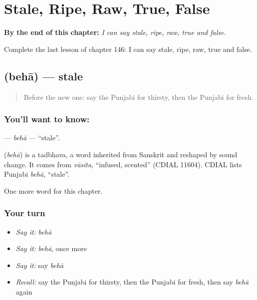 
\chapter{Stale, Ripe, Raw, True, False}
\label{ch:pa-stale-ripe-raw-true-false}

\begin{chapteropening}
\textbf{By the end of this chapter:} \emph{I can say stale, ripe, raw, true and false.}

Complete the last lesson of chapter 146: I can say stale, ripe, raw, true and false.
\end{chapteropening}

\section[\texorpdfstring{\pa{ਬੇਹਾ} (behā)}{ਬੇਹਾ (behā)}]{ (behā) — stale}

\label{lesson:PA-C146-beha}



\begin{quote}
Before the new one: say the Punjabi for thirsty, then the Punjabi for fresh.
\end{quote}

\subsection*{You'll want to know: }
\textbf{} — \emph{behā} — \textquotedblleft{}stale\textquotedblright{}.

\begin{cousinweb}
\textbf{} (\emph{behā}) is a tadbhava, a word inherited from Sanskrit and reshaped by sound change. It comes from \emph{vāsita}, \textquotedblleft{}infused, scented\textquotedblright{} (CDIAL 11604). CDIAL lists Punjabi \emph{behā}, \textquotedblleft{}stale\textquotedblright{}.
\end{cousinweb}

\begin{grammarlens}[title={What you've built}]
One more word for this chapter.
\end{grammarlens}

\subsection*{Your turn}
\begin{itemize}
\raggedright
  \item \emph{Say it:} \emph{behā}
  \item \emph{Say it:} \emph{behā}, once more
  \item \emph{Say it:} say \emph{behā}
  \item \emph{Recall:} say the Punjabi for thirsty, then the Punjabi for fresh, then say \emph{behā} again
\end{itemize}

